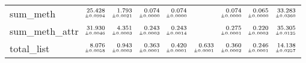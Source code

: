 \documentclass[a4paper,UKenglish]{lipics-v2016}
\begin{document}
\begin{table*}
\begin{adjustbox}{width=1.2\textwidth,center}
\begin{tabular}{lrrrrrrrr}
sum\_meth&$\substack{\mathmakebox[.7cm][r]{25.428}\\{\mathmakebox[.7cm][r]{\scriptscriptstyle \pm 0.0994}}}$&$\substack{\mathmakebox[.7cm][r]{1.793}\\{\mathmakebox[.7cm][r]{\scriptscriptstyle \pm 0.0021}}}$&$\substack{\mathmakebox[.7cm][r]{0.074}\\{\mathmakebox[.7cm][r]{\scriptscriptstyle \pm 0.0000}}}$&$\substack{\mathmakebox[.7cm][r]{0.074}\\{\mathmakebox[.7cm][r]{\scriptscriptstyle \pm 0.0000}}}$&&$\substack{\mathmakebox[.7cm][r]{0.074}\\{\mathmakebox[.7cm][r]{\scriptscriptstyle \pm 0.0000}}}$&$\substack{\mathmakebox[.7cm][r]{0.065}\\{\mathmakebox[.7cm][r]{\scriptscriptstyle \pm 0.0000}}}$&$\substack{\mathmakebox[.7cm][r]{33.283}\\{\mathmakebox[.7cm][r]{\scriptscriptstyle \pm 0.0360}}}$\\
\addlinespace
sum\_meth\_attr&$\substack{\mathmakebox[.7cm][r]{31.930}\\{\mathmakebox[.7cm][r]{\scriptscriptstyle \pm 0.0046}}}$&$\substack{\mathmakebox[.7cm][r]{4.351}\\{\mathmakebox[.7cm][r]{\scriptscriptstyle \pm 0.0003}}}$&$\substack{\mathmakebox[.7cm][r]{0.243}\\{\mathmakebox[.7cm][r]{\scriptscriptstyle \pm 0.0003}}}$&$\substack{\mathmakebox[.7cm][r]{0.243}\\{\mathmakebox[.7cm][r]{\scriptscriptstyle \pm 0.0014}}}$&&$\substack{\mathmakebox[.7cm][r]{0.275}\\{\mathmakebox[.7cm][r]{\scriptscriptstyle \pm 0.0001}}}$&$\substack{\mathmakebox[.7cm][r]{0.220}\\{\mathmakebox[.7cm][r]{\scriptscriptstyle \pm 0.0003}}}$&$\substack{\mathmakebox[.7cm][r]{35.305}\\{\mathmakebox[.7cm][r]{\scriptscriptstyle \pm 0.0125}}}$\\
\addlinespace
total\_list&$\substack{\mathmakebox[.7cm][r]{8.076}\\{\mathmakebox[.7cm][r]{\scriptscriptstyle \pm 0.0058}}}$&$\substack{\mathmakebox[.7cm][r]{0.943}\\{\mathmakebox[.7cm][r]{\scriptscriptstyle \pm 0.0003}}}$&$\substack{\mathmakebox[.7cm][r]{0.363}\\{\mathmakebox[.7cm][r]{\scriptscriptstyle \pm 0.0001}}}$&$\substack{\mathmakebox[.7cm][r]{0.420}\\{\mathmakebox[.7cm][r]{\scriptscriptstyle \pm 0.0001}}}$&$\substack{\mathmakebox[.7cm][r]{0.633}\\{\mathmakebox[.7cm][r]{\scriptscriptstyle \pm 0.0001}}}$&$\substack{\mathmakebox[.7cm][r]{0.360}\\{\mathmakebox[.7cm][r]{\scriptscriptstyle \pm 0.0002}}}$&$\substack{\mathmakebox[.7cm][r]{0.246}\\{\mathmakebox[.7cm][r]{\scriptscriptstyle \pm 0.0001}}}$&$\substack{\mathmakebox[.7cm][r]{14.138}\\{\mathmakebox[.7cm][r]{\scriptscriptstyle \pm 0.0257}}}$\\

\end{tabular}
\end{adjustbox}
\end{table*}
\end{document}
